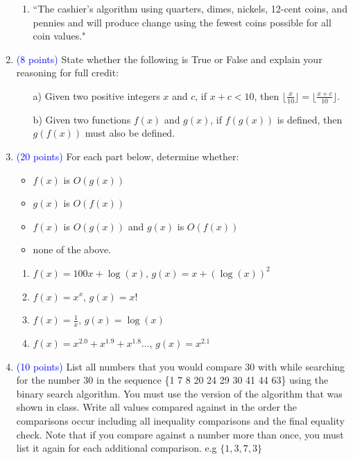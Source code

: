 \documentclass{article}
\newcommand{\pt}[1]{\textcolor{blue}{(#1 points)}}
\begin{document}
\begin{enumerate}
\begin{enumerate}
    \item ``The cashier's algorithm using quarters, dimes, nickels,  12-cent coins, and pennies and will produce change using the fewest coins possible for all coin values."

\end{enumerate}

\item \pt{8} State whether the following is True or False and explain your reasoning for full credit:
\begin{enumerate}
    \item[a)] Given two positive integers $x$ and $c$, if $x + c < 10$, then $\lfloor \frac{x}{10} \rfloor = \lfloor \frac{x + c}{10} \rfloor$.
    \item[b)] Given two functions $f(x)$ and $g(x)$, if $f(g(x))$ is defined, then $g(f(x))$ must also be defined.
\end{enumerate}
\newpage

\item \pt{20} For each part below, determine whether:
\begin{itemize}
\item $f(x)$ is $O(g(x))$ 
\item $g(x)$ is $O(f(x))$
\item $f(x)$ is $O(g(x))$ and $g(x)$ is $O(f(x))$ \item none of the above.
\end{itemize}
\begin{enumerate}
    \item $f(x) = 100x + \log(x)$, $g(x) = x + (\log(x))^2$
    \item $f(x) = x^x$, $g(x) = x!$
    \item $f(x) = \frac{1}{x}$, $g(x) = \log(x)$
    \item $f(x) = x^{2.0} + x^{1.9} + x^{1.8}...$, $g(x) = x^{2.1}$
\end{enumerate}

\item \pt{10} List all numbers that you would compare 30 with while searching for the number 30 in the sequence \{1 7 8 20 24 29 30 41 44 63\} using the binary search algorithm. You must use the version of the algorithm that was shown in class. Write all values compared against in the order the comparisons occur including all inequality comparisons and the final equality check. Note that if you compare against a number more than once, you must list it again for each additional comparison. e.g $\{1, 3, 7, 3\}$


\end{enumerate}
\end{document}
